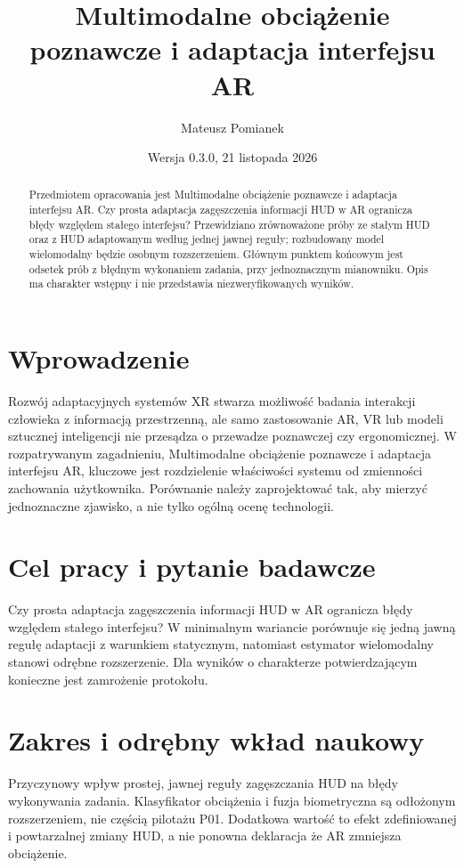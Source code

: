 \documentclass[11pt,a4paper]{article}
\title{Multimodalne obciążenie poznawcze i adaptacja interfejsu AR}
\author{Mateusz Pomianek}
\date{Wersja 0.3.0, 21 listopada 2026}
\begin{document}
\maketitle

\begin{abstract}

Przedmiotem opracowania jest Multimodalne obciążenie poznawcze i adaptacja interfejsu AR. Czy prosta adaptacja zagęszczenia informacji HUD w AR ogranicza błędy względem stałego interfejsu? Przewidziano zrównoważone próby ze stałym HUD oraz z HUD adaptowanym według jednej jawnej reguły; rozbudowany model wielomodalny będzie osobnym rozszerzeniem. Głównym punktem końcowym jest odsetek prób z błędnym wykonaniem zadania, przy jednoznacznym mianowniku. Opis ma charakter wstępny i nie przedstawia niezweryfikowanych wyników.

\end{abstract}

\section{Wprowadzenie}

Rozwój adaptacyjnych systemów XR stwarza możliwość badania interakcji człowieka z informacją przestrzenną, ale samo zastosowanie AR, VR lub modeli sztucznej inteligencji nie przesądza o przewadze poznawczej czy ergonomicznej. W rozpatrywanym zagadnieniu, Multimodalne obciążenie poznawcze i adaptacja interfejsu AR, kluczowe jest rozdzielenie właściwości systemu od zmienności zachowania użytkownika. Porównanie należy zaprojektować tak, aby mierzyć jednoznaczne zjawisko, a nie tylko ogólną ocenę technologii.

\section{Cel pracy i pytanie badawcze}

Czy prosta adaptacja zagęszczenia informacji HUD w AR ogranicza błędy względem stałego interfejsu? W minimalnym wariancie porównuje się jedną jawną regułę adaptacji z warunkiem statycznym, natomiast estymator wielomodalny stanowi odrębne rozszerzenie. Dla wyników o charakterze potwierdzającym konieczne jest zamrożenie protokołu.

\section{Zakres i odrębny wkład naukowy}
Przyczynowy wpływ prostej, jawnej reguły zagęszczania HUD na błędy wykonywania zadania. Klasyfikator obciążenia i fuzja biometryczna są odłożonym rozszerzeniem, nie częścią pilotażu P01. Dodatkowa wartość to efekt zdefiniowanej i powtarzalnej zmiany HUD, a nie ponowna deklaracja że AR zmniejsza obciążenie.
\end{document}
